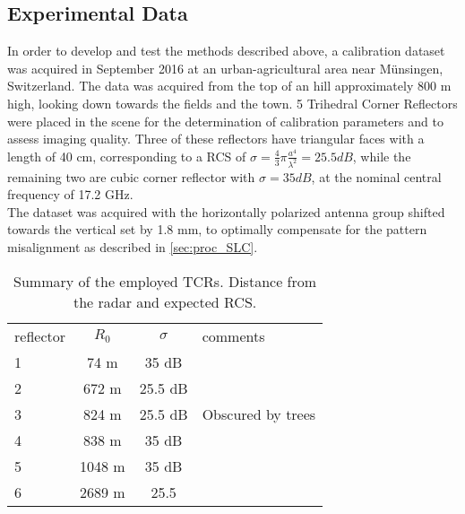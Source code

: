 \subsection{Experimental Data}\label{sec:data}
In order to develop and test the methods described above, a calibration dataset was acquired in September 2016 at an urban-agricultural area near M\"{u}nsingen, Switzerland. The data was acquired from the top of an hill approximately 800 m high, looking down towards the fields and the town. 5 Trihedral Corner Reflectors were placed in the scene for the determination of calibration parameters and to assess imaging quality. Three of these reflectors have triangular faces with a length of 40 cm, corresponding to a RCS of $\sigma=\frac{4}{3}\pi \frac{a^4}{\lambda^2}=25.5 dB$, while the remaining two are cubic corner reflector with $\sigma= 35 dB$, at the nominal central frequency of 17.2 GHz.\\
The dataset was acquired with the horizontally polarized antenna group shifted towards the vertical set by 1.8 mm, to optimally compensate for the pattern misalignment as described in \autoref{sec:proc_SLC}. 
\begin{table}[ht]
	\begin{tabular}{lccl}
		\hline
		reflector & $R_0$ & $\sigma$ & comments\\
		1 & 74 m & 35 dB & \\
		2 & 672 m & 25.5 dB & \\
		3 & 824 m & 25.5 dB & Obscured by trees\\
		4 & 838 m & 35 dB &\\
		5 & 1048 m & 35 dB&\\
		6 & 2689 m & 25.5\\
		\hline
	\end{tabular}
	\caption{Summary of the employed TCRs. Distance from the radar and expected RCS.}
	\label{tab:reflectors}
\end{table}





